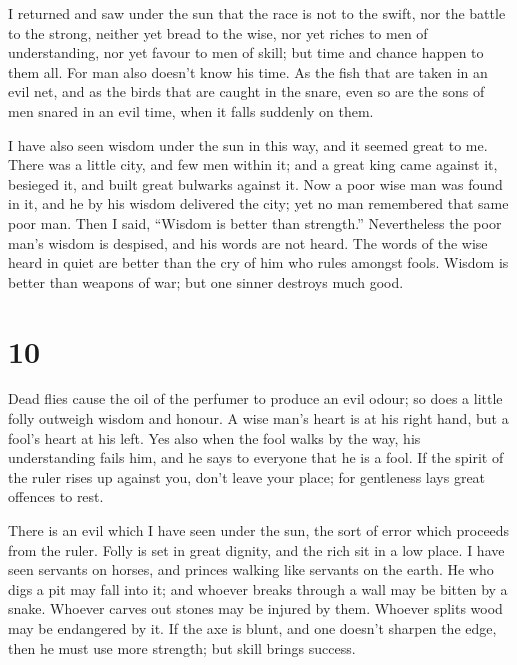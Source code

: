  I returned and saw under the sun that the race is not to
the swift, nor the battle to the strong, neither yet bread to the wise,
nor yet riches to men of understanding, nor yet favour to men of skill;
but time and chance happen to them all.  For man also
doesn't know his time. As the fish that are taken in an evil net, and as
the birds that are caught in the snare, even so are the sons of men
snared in an evil time, when it falls suddenly on them.

 I have also seen wisdom under the sun in this way, and
it seemed great to me.  There was a little city, and few
men within it; and a great king came against it, besieged it, and built
great bulwarks against it.  Now a poor wise man was found
in it, and he by his wisdom delivered the city; yet no man remembered
that same poor man.  Then I said, ``Wisdom is better than
strength.'' Nevertheless the poor man's wisdom is despised, and his
words are not heard.  The words of the wise heard in
quiet are better than the cry of him who rules amongst fools.
 Wisdom is better than weapons of war; but one sinner
destroys much good.

\hypertarget{section-9}{%
\section{10}\label{section-9}}

 Dead flies cause the oil of the perfumer to produce an
evil odour; so does a little folly outweigh wisdom and honour.
 A wise man's heart is at his right hand, but a fool's
heart at his left.  Yes also when the fool walks by the
way, his understanding fails him, and he says to everyone that he is a
fool.  If the spirit of the ruler rises up against you,
don't leave your place; for gentleness lays great offences to rest.

 There is an evil which I have seen under the sun, the
sort of error which proceeds from the ruler.  Folly is set
in great dignity, and the rich sit in a low place.  I have
seen servants on horses, and princes walking like servants on the earth.
 He who digs a pit may fall into it; and whoever breaks
through a wall may be bitten by a snake.  Whoever carves
out stones may be injured by them. Whoever splits wood may be endangered
by it.  If the axe is blunt, and one doesn't sharpen the
edge, then he must use more strength; but skill brings success.

